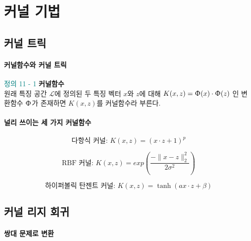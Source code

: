 \documentclass [12pt] {oblivoir}
\begin{document}
\vspace{3mm}

\newpage
\section{커널 기법}

\subsection{커널 트릭}

\paragraph*{커널함수와 커널 트릭}\mbox{}
\vspace{3mm}

\begin{mdframed}
  \textcolor{teal}{정의 11 - 1} \textbf{커널함수} \\
  원래 특징 공간
  $\mathcal{L}$에 정의된 두 특징 벡터 $x$와 $z$에 대해 $K(x, z) = \Upphi(x) \cdot \Upphi(z)$
  인 변환함수 $\Upphi$가 존재하면 $K(x, z)$를 커널함수라 부른다.
\end{mdframed}

\paragraph*{널리 쓰이는 세 가지 커널함수}\mbox{}

\begin{equation} \tag{11.6}
  \text{다항식 커널: } K(x, z) = (x \cdot z + 1)^{p}
\end{equation}

\begin{equation} \tag{11.7}
  \text{RBF 커널: } K(x, z) = exp\left(\frac{-\lVert x - z \rVert^{2}_{2}}{2 \sigma^{2}}\right)
\end{equation}

\begin{equation} \tag{11.8}
  \text{하이퍼볼릭 탄젠트 커널: } K(x, z) = \tanh(ax \cdot z + \beta)
\end{equation}

\vspace{3mm}

\subsection{커널 리지 회귀}

\paragraph*{쌍대 문제로 변환}\mbox{}
\end{document}
